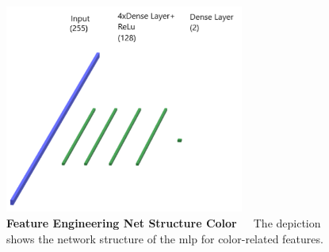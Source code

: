 \begin{figure}[!htb]
	\centering
	\includegraphics[width=0.70\textwidth]{Figures/chapter04/fe_color.png}
	\decoRule
	\caption[Feature Engineering Net Structure Color]{\textbf{Feature Engineering Net Structure Color}~~~The depiction shows the network structure of the \acrshort{mlp} for color-related features.}
	\label{fig:FeatureEngineeringNetStructureColor}
\end{figure}

\begin{table}[!h]
	\centering
	\caption[Feature Engineering Color-Histogram-Based Prediction]{\textbf{Feature Engineering Color-Histogram-Based Prediction}~~~Performance of color histogram-based predictions with a \acrshort{mlp}.}
	\label{tab:performance_color_feature_based}
\end{table} 

